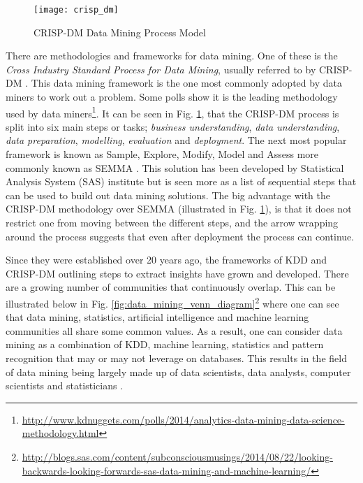 \begin{figure}[H]
	\texttt{[image: crisp\_dm]}
	\caption{CRISP-DM Data Mining Process Model \\
		\cite[Source:][]{shearer_crisp-dm_2000}		
	}
	\label{fig:crisp_dm}
\end{figure}

There are methodologies and frameworks for data mining. One of these is the \textit{Cross Industry Standard Process for Data Mining}, usually referred to by CRISP-DM \citep{shearer_crisp-dm_2000}. This data mining framework is the one most commonly adopted by data miners to work out a problem. Some polls show it is the leading methodology used by data miners\footnote{\url{http://www.kdnuggets.com/polls/2014/analytics-data-mining-data-science-methodology.html}}. It can be seen in Fig. \ref{fig:crisp_dm}, that the CRISP-DM process is split into six main steps or tasks; \textit{business understanding}, \textit{data understanding}, \textit{data preparation}, \textit{modelling}, \textit{evaluation} and \textit{deployment}. The next most popular framework is known as Sample, Explore, Modify, Model and Assess more commonly known as SEMMA \citep{azevedo_kdd_2008}. This solution has been developed by Statistical Analysis System (SAS) institute but is seen more as a list of sequential steps that can be used to build out data mining solutions. The big advantage with the CRISP-DM methodology over SEMMA (illustrated in Fig. \ref{fig:crisp_dm}), is that it does not restrict one from moving between the different steps, and the arrow wrapping around the process suggests that even after deployment the process can continue.  


Since they were established over 20 years ago, the frameworks of KDD and CRISP-DM outlining steps to extract insights have grown and developed. There are a growing number of communities that continuously overlap. This can be illustrated below in Fig. \ref{fig:data_mining_venn_diagram}\footnote{\url{http://blogs.sas.com/content/subconsciousmusings/2014/08/22/looking-backwards-looking-forwards-sas-data-mining-and-machine-learning/}} where one can see that data mining, statistics, artificial intelligence and machine learning communities all share some common values. As a result, one can consider data mining as a
combination of KDD, machine learning, statistics and pattern recognition that may or may not leverage on databases. This results in the field of data mining being largely made up of data scientists, data analysts, computer scientists and statisticians \citep{coenen_data_2011}. 

